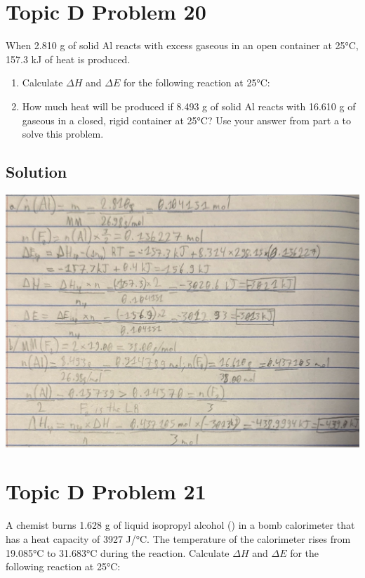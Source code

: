 \documentclass[10pt]{article}
\begin{document}
\begin{center}
            \end{center}

    \pagebreak
    \section{Topic D Problem 20}
        When 2.810 g of solid Al reacts with excess gaseous  in an open container at 25\unit{\celsius}, 157.3 kJ of heat is produced.
        \begin{enumerate}
            \item   Calculate $\Delta H$ and $\Delta E$ for the following reaction at 25\unit{\celsius}:\\ 
            \item   How much heat will be produced if 8.493 g of solid Al reacts with 16.610 g of gaseous  in a closed, rigid container at 25\unit{\celsius}? 
                Use your answer from part a to solve this problem.
        \end{enumerate}
        
        \subsection{Solution}
            \begin{center}
                \includegraphics[width=\textwidth]{Answers Images/Problem 20.jpg}
            \end{center}

    \pagebreak
    \section{Topic D Problem 21}
        A chemist burns 1.628 g of liquid isopropyl alcohol () in a bomb calorimeter that has a heat capacity of 3927 J/\unit{\celsius}. 
        The temperature of the calorimeter rises from 19.085\unit{\celsius} to 31.683\unit{\celsius} during the reaction. 
        Calculate $\Delta H$ and $\Delta E$ for the following reaction at 25\unit{\celsius}:\\
        
\end{document}
